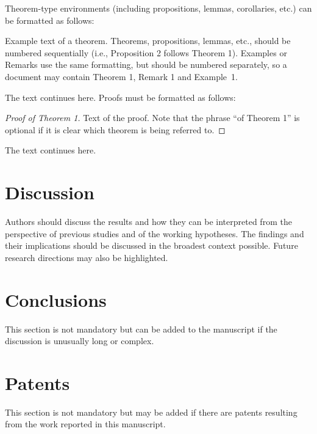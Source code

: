 \documentclass[journal,article,submit,moreauthors]{Definitions/mdpi}
\begin{document}
Theorem-type environments (including propositions, lemmas, corollaries, etc.) can be formatted as follows:
\begin{Theorem}
Example text of a theorem. Theorems, propositions, lemmas, etc., should be numbered sequentially (i.e., Proposition 2 follows Theorem 1). Examples or Remarks use the same formatting, but should be numbered separately, so a document may contain Theorem 1, Remark 1 and Example~1.
\end{Theorem}

The text continues here. Proofs must be formatted as follows:

\begin{proof}[Proof of Theorem 1]
Text of the proof. Note that the phrase ``of Theorem 1'' is optional if it is clear which theorem is being referred to.
\end{proof}
The text continues here.

\section{Discussion}

Authors should discuss the results and how they can be interpreted from the perspective of previous studies and of the working hypotheses. The findings and their implications should be discussed in the broadest context possible. Future research directions may also be highlighted.

\section{Conclusions}

This section is not mandatory but can be added to the manuscript if the discussion is unusually long or complex.

\section{Patents}

This section is not mandatory but may be added if there are patents resulting from the work reported in this manuscript.

\vspace{6pt} 

\end{document}
